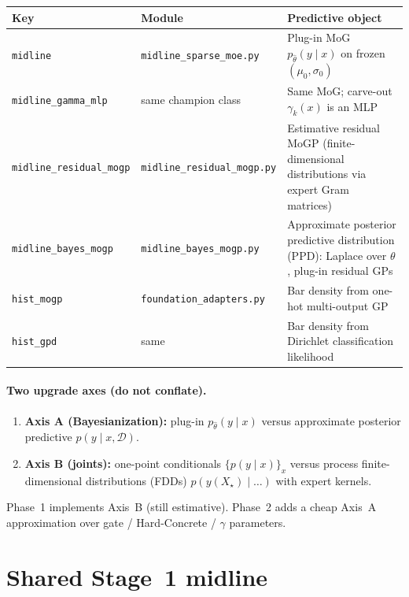 \documentclass[11pt,a4paper]{article}
\newcommand{\Dcal}{\mathcal{D}}
\theoremstyle{definition}
\begin{document}
\begin{center}
\renewcommand{\arraystretch}{1.15}
\begin{tabular}{@{}llp{6.0cm}@{}}
\toprule
Key & Module & Predictive object \\
\midrule
\texttt{midline} &
  \texttt{midline\_sparse\_moe.py} &
  Plug-in MoG $p_{\hat\theta}(y\mid x)$ on frozen $(\mu_0,\sigma_0)$ \\
\texttt{midline\_gamma\_mlp} &
  same champion class &
  Same MoG; carve-out $\gamma_k(x)$ is an MLP \\
\texttt{midline\_residual\_mogp} &
  \texttt{midline\_residual\_mogp.py} &
  Estimative residual MoGP
  (finite-dimensional distributions via expert Gram matrices) \\
\texttt{midline\_bayes\_mogp} &
  \texttt{midline\_bayes\_mogp.py} &
  Approximate posterior predictive distribution (PPD):
  Laplace over $\theta$, plug-in residual GPs \\
\texttt{hist\_mogp} &
  \texttt{foundation\_adapters.py} &
  Bar density from one-hot multi-output GP \\
\texttt{hist\_gpd} &
  same &
  Bar density from Dirichlet classification likelihood \\
\bottomrule
\end{tabular}
\end{center}

\paragraph{Two upgrade axes (do not conflate).}
\begin{enumerate}[leftmargin=1.4em,itemsep=2pt]
\item \textbf{Axis A (Bayesianization):} plug-in $p_{\hat\theta}(y\mid x)$
  versus approximate posterior predictive $p(y\mid x,\Dcal)$.
\item \textbf{Axis B (joints):} one-point conditionals
  $\{p(y\mid x)\}_x$ versus process finite-dimensional distributions (FDDs)
  $p(y(X_\star)\mid\ldots)$ with expert kernels.
\end{enumerate}
Phase~1 implements Axis~B (still estimative). Phase~2 adds a cheap Axis~A
approximation over gate / Hard-Concrete / $\gamma$ parameters.

\section{Shared Stage~1 midline}
\end{document}
